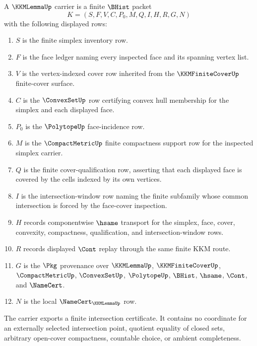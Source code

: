 \begin{definition}
\label{def:kkm-lemma-carrier}
A $\KKMLemmaUp$ carrier is a finite $\BHist$ packet
$$
K=(S,F,V,C,P_0,M,Q,I,H,R,G,N)
$$
with the following displayed rows:
\begin{enumerate}
\item $S$ is the finite simplex inventory row.
\item $F$ is the face ledger naming every inspected face and its spanning vertex list.
\item $V$ is the vertex-indexed cover row inherited from the $\KKMFiniteCoverUp$ finite-cover surface.
\item $C$ is the $\ConvexSetUp$ row certifying convex hull membership for the simplex and each displayed face.
\item $P_0$ is the $\PolytopeUp$ face-incidence row.
\item $M$ is the $\CompactMetricUp$ finite compactness support row for the inspected simplex carrier.
\item $Q$ is the finite cover-qualification row, asserting that each displayed face is covered by the cells indexed by its own vertices.
\item $I$ is the intersection-window row naming the finite subfamily whose common intersection is forced by the face-cover inspection.
\item $H$ records componentwise $\hsame$ transport for the simplex, face, cover, convexity, compactness, qualification, and intersection-window rows.
\item $R$ records displayed $\Cont$ replay through the same finite KKM route.
\item $G$ is the $\Pkg$ provenance over $\KKMLemmaUp$, $\KKMFiniteCoverUp$, $\CompactMetricUp$, $\ConvexSetUp$, $\PolytopeUp$, $\BHist$, $\hsame$, $\Cont$, and $\NameCert$.
\item $N$ is the local $\NameCert_{\KKMLemmaUp}$ row.
\end{enumerate}
The carrier exports a finite intersection certificate. It contains no coordinate for an externally selected intersection point, quotient equality of closed sets, arbitrary open-cover compactness, countable choice, or ambient completeness.
\end{definition}

